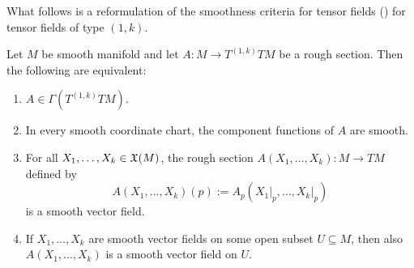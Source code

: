 \begin{appendix}
What follows is a reformulation of the smoothness criteria for tensor fields (\cite[317--318]{lee:smooth_manifolds:2013}) for tensor fields of type $(1,k)$.

\begin{proposition}
Let $M$ be smooth manifold and let $A : M \to T^{(1,k)}TM$ be a rough section. Then the following are equivalent:
\begin{enumerate}[label = \textup{(}\alph*\textup{)}]
\item $A \in \Gamma(T^{(1,k)}TM)$.
\item In every smooth coordinate chart, the component functions of $A$ are smooth.
\item For all $X_1,\dots,X_k \in \mathfrak{X}(M)$, the rough section $A(X_1,\dots,X_k) : M \to TM$ defined by
\begin{equation}
A(X_1,\dots,X_k)(p) := A_p(X_1\vert_p,\dots,X_k\vert_p)
\end{equation}
\noindent is a smooth vector field.
\item If $X_1,\dots,X_k$ are smooth vector fields on some open subset $U \subseteq M$, then also $A(X_1,\dots,X_k)$ is a smooth vector field on $U$.
\end{enumerate}
\label{prop:smoothness_tensor}
\end{proposition}


\end{appendix}
